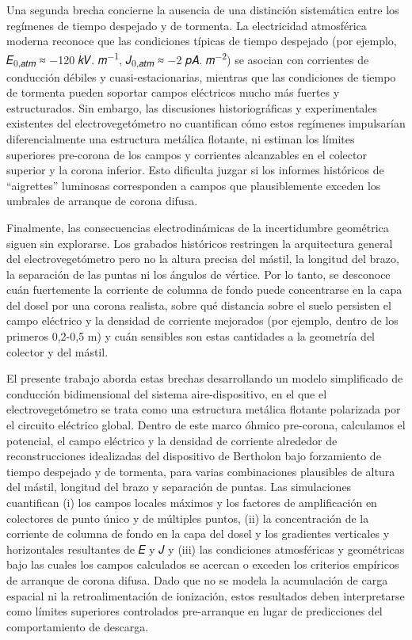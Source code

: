 \documentclass[
]{article}
\begin{document}
Una segunda brecha concierne la ausencia de una distinción sistemática
entre los regímenes de tiempo despejado y de tormenta. La electricidad
atmosférica moderna reconoce que las condiciones típicas de tiempo
despejado (por ejemplo, 𝐸\textsubscript{0,𝑎𝑡𝑚} ≈ −120 𝑘𝑉.
𝑚\textsuperscript{−1}, 𝐽\textsubscript{0,𝑎𝑡𝑚} ≈ −2 𝑝𝐴.
𝑚\textsuperscript{−2}) se asocian con corrientes de conducción débiles y
cuasi-estacionarias, mientras que las condiciones de tiempo de tormenta
pueden soportar campos eléctricos mucho más fuertes y estructurados. Sin
embargo, las discusiones historiográficas y experimentales existentes
del electrovegetómetro no cuantifican cómo estos regímenes impulsarían
diferencialmente una estructura metálica flotante, ni estiman los
límites superiores pre-corona de los campos y corrientes alcanzables en
el colector superior y la corona inferior. Esto dificulta juzgar si los
informes históricos de ``aigrettes'' luminosas corresponden a campos que
plausiblemente exceden los umbrales de arranque de corona difusa.

Finalmente, las consecuencias electrodinámicas de la incertidumbre
geométrica siguen sin explorarse. Los grabados históricos restringen la
arquitectura general del electrovegetómetro pero no la altura precisa
del mástil, la longitud del brazo, la separación de las puntas ni los
ángulos de vértice. Por lo tanto, se desconoce cuán fuertemente la
corriente de columna de fondo puede concentrarse en la capa del dosel
por una corona realista, sobre qué distancia sobre el suelo persisten el
campo eléctrico y la densidad de corriente mejorados (por ejemplo,
dentro de los primeros 0,2-0,5 m) y cuán sensibles son estas cantidades
a la geometría del colector y del mástil.

El presente trabajo aborda estas brechas desarrollando un modelo
simplificado de conducción bidimensional del sistema aire-dispositivo,
en el que el electrovegetómetro se trata como una estructura metálica
flotante polarizada por el circuito eléctrico global. Dentro de este
marco óhmico pre-corona, calculamos el potencial, el campo eléctrico y
la densidad de corriente alrededor de reconstrucciones idealizadas del
dispositivo de Bertholon bajo forzamiento de tiempo despejado y de
tormenta, para varias combinaciones plausibles de altura del mástil,
longitud del brazo y separación de puntas. Las simulaciones cuantifican
(i) los campos locales máximos y los factores de amplificación en
colectores de punto único y de múltiples puntos, (ii) la concentración
de la corriente de columna de fondo en la capa del dosel y los
gradientes verticales y horizontales resultantes de \textbar 𝐸\textbar{}
y \textbar 𝐽\textbar{} y (iii) las condiciones atmosféricas y
geométricas bajo las cuales los campos calculados se acercan o exceden
los criterios empíricos de arranque de corona difusa. Dado que no se
modela la acumulación de carga espacial ni la retroalimentación de
ionización, estos resultados deben interpretarse como límites superiores
controlados pre-arranque en lugar de predicciones del comportamiento de
descarga.
\end{document}
